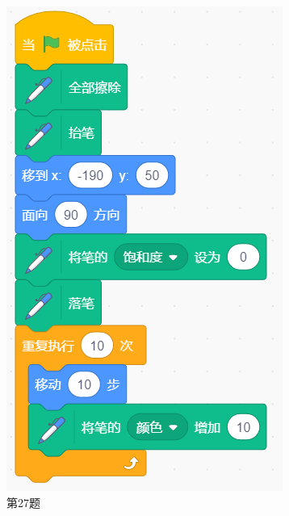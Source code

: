 \documentclass[10pt, a4paper]{article}
\begin{document}
\begin{figure}[htbp]
\begin{minipage}[t]{.18\textwidth}
            \includegraphics[width=\textwidth]{27.png}
            \caption*{第27题}
        \end{minipage}
        \begin{minipage}[t]{.33\textwidth}
            \centering
            \begin{minipage}[t]{.55\textwidth}
                \centering

\end{minipage}
\end{minipage}
\end{figure}
\end{document}
